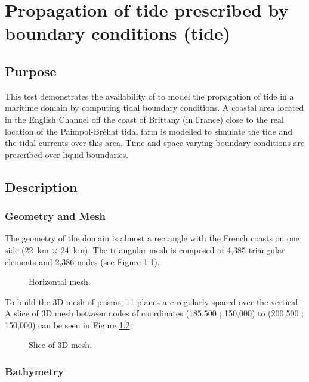 \chapter{Propagation of tide prescribed by boundary conditions (tide)}

\section{Purpose}

This test demonstrates the availability of  to model the
propagation of tide in a maritime domain by computing tidal
boundary conditions.
A coastal area located in the English Channel off the coast of
Brittany (in France) close to the real location of the Paimpol-Bréhat
tidal farm is modelled to simulate the tide and the tidal currents
over this area.
Time and space varying boundary conditions are prescribed over
liquid boundaries.

\section{Description}

\subsection{Geometry and Mesh}

The geometry of the domain is almost a rectangle with the French coasts on
one side (22~km $\times$ 24~km).
The triangular mesh is composed of 4,385 triangular elements and 2,386 nodes
(see Figure \ref{fig:tide:mesh}).

\begin{figure}[H]
 \centering
  \caption{Horizontal mesh.}\label{fig:tide:mesh}
\end{figure}

To build the 3D mesh of prisms, 11 planes are regularly spaced over the vertical.
A slice of 3D mesh between nodes of coordinates (185,500 ; 150,000) to
(200,500 ; 150,000) can be seen in Figure \ref{fig:tide:mesh:section}.

\begin{figure}[H]
 \centering
  \caption{Slice of 3D mesh.}\label{fig:tide:mesh:section}
\end{figure}

\subsection{Bathymetry}

